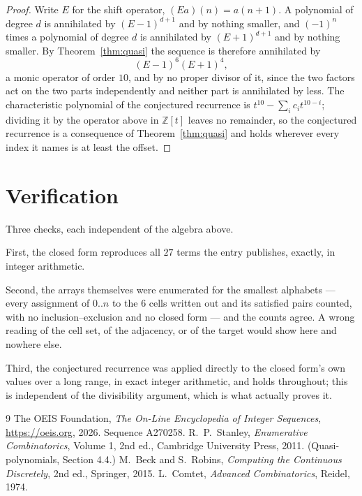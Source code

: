 \documentclass[11pt,a4paper]{article}
\theoremstyle{plain}
\theoremstyle{definition}
\begin{document}
\begin{proof}
Write $E$ for the shift operator, $(Ea)(n)=a(n+1)$. A polynomial of degree $d$ is annihilated
by $(E-1)^{d+1}$ and by nothing smaller, and $(-1)^n$ times a polynomial of degree $d$ is
annihilated by $(E+1)^{d+1}$ and by nothing smaller. By Theorem~\ref{thm:quasi} the
sequence is therefore annihilated by
\[
(E-1)^{6}(E+1)^{4},
\]
a monic operator of order $10$, and by no proper divisor of it, since the two
factors act on the two parts independently and neither part is annihilated by less. The
characteristic polynomial of the conjectured recurrence is
$t^{10}-\sum_i c_it^{10-i}$; dividing it by the operator above in
$\mathbb{Z}[t]$ leaves no remainder, so the conjectured recurrence is a consequence of
Theorem~\ref{thm:quasi} and holds wherever every index it names is at least the offset.
\end{proof}

\section{Verification}

Three checks, each independent of the algebra above.

First, the closed form reproduces all $27$ terms the entry publishes, exactly, in integer
arithmetic.

Second, the arrays themselves were enumerated for the smallest alphabets --- every assignment
of $0..n$ to the $6$ cells written out and its satisfied pairs counted, with no
inclusion--exclusion and no closed form --- and the counts agree. A wrong reading of the cell
set, of the adjacency, or of the target would show here and nowhere else.

Third, the conjectured recurrence was applied directly to the closed form's own values over a
long range, in exact integer arithmetic, and holds throughout; this is independent of the
divisibility argument, which is what actually proves it.

\begin{thebibliography}{9}
 The OEIS Foundation, \emph{The On-Line Encyclopedia of Integer
Sequences}, \url{https://oeis.org}, 2026. Sequence A270258.
 R.~P.~Stanley, \emph{Enumerative Combinatorics}, Volume 1, 2nd ed.,
Cambridge University Press, 2011. (Quasi-polynomials, Section 4.4.)
 M.~Beck and S.~Robins, \emph{Computing the Continuous Discretely}, 2nd ed.,
Springer, 2015.
 L.~Comtet, \emph{Advanced Combinatorics}, Reidel, 1974.
\end{thebibliography}
\end{document}
